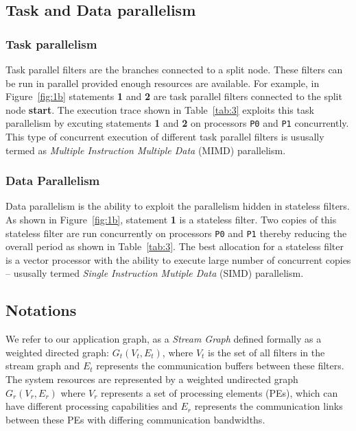 \documentclass[10pt, conference, compsocconf, reqno]{IEEEtran}
\begin{document}
\subsection{Task and Data parallelism}

\subsubsection{Task parallelism}
Task parallel filters are the branches connected to a split node. These
filters can be run in parallel provided enough resources are available. For
example, in Figure~\ref{fig:1b} statements \textbf{1} and \textbf{2} are task
parallel filters connected to the split node \textbf{start}. The execution trace shown
in Table~\ref{tab:3} exploits this task parallelism by excuting statements
\textbf{1} and \textbf{2} on processors \texttt{P0} and \texttt{P1}
concurrently. This type of concurrent execution of different task parallel
filters is ususally termed as \textit{Multiple Instruction Multiple Data}
(MIMD) parallelism.

\subsubsection{Data Parallelism}
Data parallelism is the ability to exploit the parallelism hidden in stateless
filters. As shown in Figure~\ref{fig:1b}, statement \textbf{1} is a stateless
filter. Two copies of this stateless filter are run concurrently on processors
\texttt{P0} and \texttt{P1} thereby reducing the overall period as shown in
Table~\ref{tab:3}. The best allocation for a stateless filter is a vector
processor with the ability to execute large number of concurrent copies --
ususally termed \textit{Single Instruction Mutiple Data} (SIMD) parallelism.

\subsection{Notations}

We refer to our application graph, as a \textit{Stream Graph} defined
formally as a weighted directed graph: $G_t(V_t, E_t)$, where $V_t$ is
the set of all filters in the stream graph and $E_t$ represents the
communication buffers between these filters. The system resources are
represented by a weighted undirected graph $G_r(V_r, E_r)$ where $V_r$
represents a set of processing elements (PEs), which can have different
processing capabilities and $E_r$ represents the communication links
between these PEs with differing communication
bandwidths. %
\end{document}
